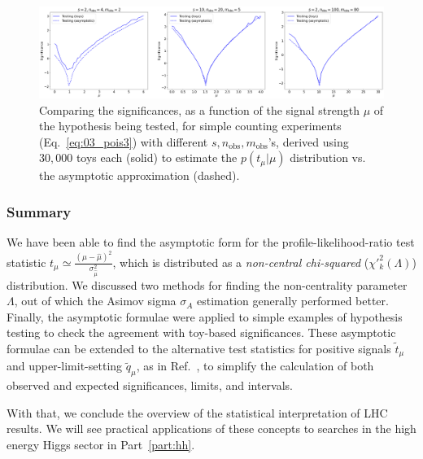 \begin{figure}[htb]
  \centering
  \includegraphics[width=\textwidth]{figures/03-Stats/06-asymptotic-plr/5.png}
  \caption[Comparing the significances, as a function of the signal strength $\mu$ of the hypothesis being tested, for simple counting experiments (Eq.~\ref{eq:03_pois3}) with different $s, n_\mathrm{obs}, m_\mathrm{obs}$'s.]{Comparing the significances, as a function of the signal strength $\mu$ of the hypothesis being tested, for simple counting experiments (Eq.~\ref{eq:03_pois3}) with different $s, n_\mathrm{obs}, m_\mathrm{obs}$'s, derived using $30,000$ toys each (solid) to estimate the $p(t_\mu|\mu)$ distribution vs. the asymptotic approximation (dashed).}
  \label{fig:03_asym_significances}
\end{figure}


\subsubsection{Summary}

We have been able to find the asymptotic form for the profile-likelihood-ratio test statistic $t_\mu \simeq \frac{(\mu-\hat\mu)^2}{\sigma_{\hat\mu}^2}$, which is distributed as a \textit{non-central chi-squared} ($\chi'^2_k(\Lambda)$) distribution.
We discussed two methods for finding the non-centrality parameter $\Lambda$, out of which the Asimov sigma $\sigma_A$ estimation generally performed better.
Finally, the asymptotic formulae were applied to simple examples of hypothesis testing to check the agreement with toy-based significances.
These asymptotic formulae can be extended to the alternative test statistics for positive signals $\tilde{t}_\mu$ and upper-limit-setting $\tilde{q}_\mu$, as in Ref.~\cite{Cowan:2010js}, to simplify the calculation of both observed and expected significances, limits, and intervals.

With that, we conclude the overview of the statistical interpretation of LHC results.
We will see practical applications of these concepts to searches in the high energy Higgs sector in Part~\ref{part:hh}.



